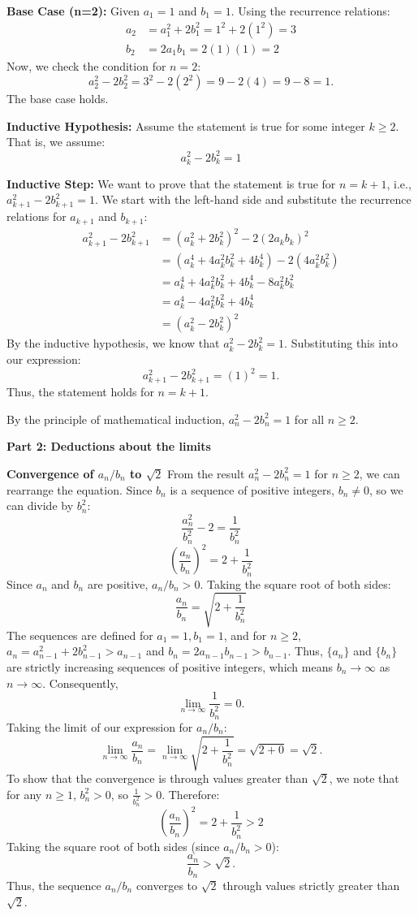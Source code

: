 \textbf{Base Case (n=2):}
Given $a_1 = 1$ and $b_1 = 1$. Using the recurrence relations:
\begin{align*}
a_2 &= a_1^2 + 2b_1^2 = 1^2 + 2(1^2) = 3 \\
b_2 &= 2a_1b_1 = 2(1)(1) = 2
\end{align*}
Now, we check the condition for $n=2$:
\[ a_2^2 - 2b_2^2 = 3^2 - 2(2^2) = 9 - 2(4) = 9 - 8 = 1. \]
The base case holds.

\textbf{Inductive Hypothesis:}
Assume the statement is true for some integer $k \geq 2$. That is, we assume:
\[ a_k^2 - 2b_k^2 = 1 \]

\textbf{Inductive Step:}
We want to prove that the statement is true for $n=k+1$, i.e., $a_{k+1}^2 - 2b_{k+1}^2 = 1$.
We start with the left-hand side and substitute the recurrence relations for $a_{k+1}$ and $b_{k+1}$:
\begin{align*}
a_{k+1}^2 - 2b_{k+1}^2 &= (a_k^2 + 2b_k^2)^2 - 2(2a_k b_k)^2 \\
&= (a_k^4 + 4a_k^2 b_k^2 + 4b_k^4) - 2(4a_k^2 b_k^2) \\
&= a_k^4 + 4a_k^2 b_k^2 + 4b_k^4 - 8a_k^2 b_k^2 \\
&= a_k^4 - 4a_k^2 b_k^2 + 4b_k^4 \\
&= (a_k^2 - 2b_k^2)^2
\end{align*}
By the inductive hypothesis, we know that $a_k^2 - 2b_k^2 = 1$. Substituting this into our expression:
\[ a_{k+1}^2 - 2b_{k+1}^2 = (1)^2 = 1. \]
Thus, the statement holds for $n=k+1$.

By the principle of mathematical induction, $a_n^2 - 2b_n^2 = 1$ for all $n \geq 2$.

\textbf{Part 2: Deductions about the limits}

\textbf{Convergence of $a_n/b_n$ to $\sqrt{2}$}
From the result $a_n^2 - 2b_n^2 = 1$ for $n \geq 2$, we can rearrange the equation. Since $b_n$ is a sequence of positive integers, $b_n \neq 0$, so we can divide by $b_n^2$:
\[ \frac{a_n^2}{b_n^2} - 2 = \frac{1}{b_n^2} \]
\[ \left(\frac{a_n}{b_n}\right)^2 = 2 + \frac{1}{b_n^2} \]
Since $a_n$ and $b_n$ are positive, $a_n/b_n > 0$. Taking the square root of both sides:
\[ \frac{a_n}{b_n} = \sqrt{2 + \frac{1}{b_n^2}} \]
The sequences are defined for $a_1=1, b_1=1$, and for $n \geq 2$, $a_n = a_{n-1}^2+2b_{n-1}^2 > a_{n-1}$ and $b_n = 2a_{n-1}b_{n-1} > b_{n-1}$. Thus, $\{a_n\}$ and $\{b_n\}$ are strictly increasing sequences of positive integers, which means $b_n \to \infty$ as $n \to \infty$.
Consequently,
\[ \lim_{n \to \infty} \frac{1}{b_n^2} = 0. \]
Taking the limit of our expression for $a_n/b_n$:
\[ \lim_{n \to \infty} \frac{a_n}{b_n} = \lim_{n \to \infty} \sqrt{2 + \frac{1}{b_n^2}} = \sqrt{2+0} = \sqrt{2}. \]
To show that the convergence is through values greater than $\sqrt{2}$, we note that for any $n \geq 1$, $b_n^2 > 0$, so $\frac{1}{b_n^2} > 0$. Therefore:
\[ \left(\frac{a_n}{b_n}\right)^2 = 2 + \frac{1}{b_n^2} > 2 \]
Taking the square root of both sides (since $a_n/b_n > 0$):
\[ \frac{a_n}{b_n} > \sqrt{2}. \]
Thus, the sequence $a_n/b_n$ converges to $\sqrt{2}$ through values strictly greater than $\sqrt{2}$.

